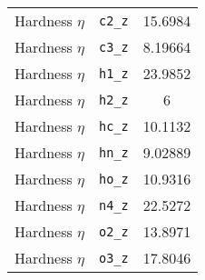 \begin{table}[ht]
\begin{tabular}{|c|c|c|}
Hardness $\eta$ & \verb^c2_z^ & 15.6984 \\ 
Hardness $\eta$ & \verb^c3_z^ & 8.19664 \\ 
Hardness $\eta$ & \verb^h1_z^ & 23.9852 \\ 
Hardness $\eta$ & \verb^h2_z^ & 6 \\ 
Hardness $\eta$ & \verb^hc_z^ & 10.1132 \\ 
Hardness $\eta$ & \verb^hn_z^ & 9.02889 \\ 
Hardness $\eta$ & \verb^ho_z^ & 10.9316 \\ 
Hardness $\eta$ & \verb^n4_z^ & 22.5272 \\ 
Hardness $\eta$ & \verb^o2_z^ & 13.8971 \\ 
Hardness $\eta$ & \verb^o3_z^ & 17.8046 \\ 
\hline
\end{tabular}
\end{table}
